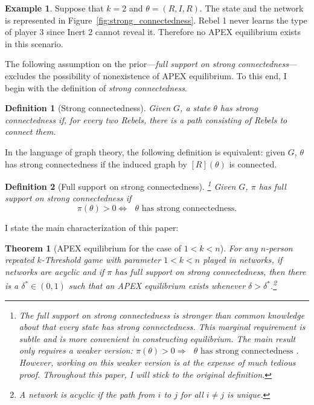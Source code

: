 \documentclass[12pt,letter]{article}
\newtheorem{theorem}{Theorem}
\newtheorem{definition}{Definition}[section]
\theoremstyle{definition}
\newtheorem{example}{Example}
\theoremstyle{remark}
\theoremstyle{claim}
\begin{document}
\begin{example}\label{ex_strong_connectedness}
Suppose that $k=2$ and $\theta=(R,I,R)$. The state and the network is represented in Figure~\ref{fig:strong_connectedness}. Rebel 1 never learns the type of player 3 since Inert 2 cannot reveal it. Therefore no APEX equilibrium exists in this scenario.
\end{example}

The following assumption on the prior---\textit{full support on strong connectedness}---excludes the possibility of nonexistence of APEX equilibrium. To this end, I begin with the definition of \textit{strong connectedness}.

\begin{definition}[Strong connectedness]
Given $G$, a state $\theta$ has strong connectedness if, for every two Rebels, there is a path consisting of Rebels to connect them.

\end{definition}  

In the language of graph theory, the following definition is equivalent: given $G$, $\theta$ has strong connectedness if the induced graph by $[R](\theta)$ is connected.

\begin{definition}[Full support on strong connectedness]\footnote{The full support on strong connectedness is stronger than common knowledge about that every state has strong connectedness. This marginal requirement is subtle and is more convenient in constructing equilibrium. The main result only requires a weaker version: $\pi(\theta)>0\Rightarrow \text{ $\theta$ has strong connectedness }$. However, working on this weaker version is at the expense of much tedious proof. Throughout this paper, I will stick to the original definition.}
Given $G$, $\pi$ has full support on strong connectedness if 
\[\pi(\theta)>0\Leftrightarrow \text{ $\theta$ has strong connectedness}.\]
\end{definition}  

I state the main characterization of this paper:
\begin{theorem}[APEX equilibrium for the case of $1<k<n$]
\label{thm_main_result}
For any $n$-person repeated $k$-Threshold game with parameter $1<k<n$ played in networks, if networks are acyclic and if $\pi$ has full support on strong connectedness, then there is a $\delta^{*}\in(0,1)$ such that an APEX equilibrium exists whenever $\delta>\delta^{*}$.\footnote{A network is acyclic if the path from $i$ to $j$ for all $i\neq j$ is unique.}

\end{theorem}
\end{document}

